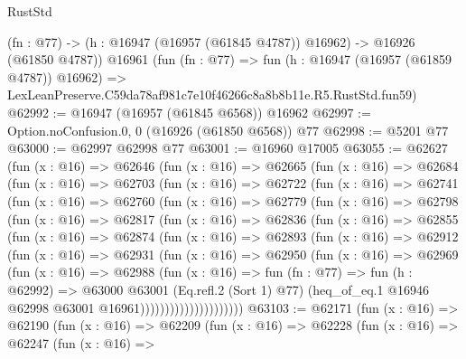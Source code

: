 \begin{lexlean}{RustStd}
\begin{coremodule}
    (fn : @77) -> (h : @16947 (@16957 (@61845 @4787)) @16962) -> @16926 (@61850 @4787))
    @16961
    (fun (fn : @77) =>
    fun (h : @16947 (@16957 (@61859 @4787)) @16962) =>
    LexLeanPreserve.C59da78af981c7e10f46266c8a8b8b11e.R5.RustStd.fun59)
@62992 := @16947 (@16957 (@61845 @6568)) @16962
@62997 := Option.noConfusion.{0, 0} (@16926 (@61850 @6568)) @77
@62998 := @5201 @77
@63000 := @62997 @62998 @77
@63001 := @16960 @17005
@63055 := @62627
    (fun (x : @16) =>
    @62646
      (fun (x : @16) =>
      @62665
        (fun (x : @16) =>
        @62684
          (fun (x : @16) =>
          @62703
            (fun (x : @16) =>
            @62722
              (fun (x : @16) =>
              @62741
                (fun (x : @16) =>
                @62760
                  (fun (x : @16) =>
                  @62779
                    (fun (x : @16) =>
                    @62798
                      (fun (x : @16) =>
                      @62817
                        (fun (x : @16) =>
                        @62836
                          (fun (x : @16) =>
                          @62855
                            (fun (x : @16) =>
                            @62874
                              (fun (x : @16) =>
                              @62893
                                (fun (x : @16) =>
                                @62912
                                  (fun (x : @16) =>
                                  @62931
                                    (fun (x : @16) =>
                                    @62950
                                      (fun (x : @16) =>
                                      @62969
                                        (fun (x : @16) =>
                                        @62988
                                          (fun (x : @16) =>
                                          fun (fn : @77) =>
                                          fun (h : @62992) =>
                                          @63000
                                            @63001
                                            (Eq.refl.{2} (Sort 1) @77)
                                            (heq_of_eq.{1}
                                              @16946
                                              @62998
                                              @63001
                                              @16961)))))))))))))))))))))
@63103 := @62171
    (fun (x : @16) =>
    @62190
      (fun (x : @16) =>
      @62209
        (fun (x : @16) =>
        @62228
          (fun (x : @16) =>
          @62247
            (fun (x : @16) =>

\end{coremodule}
\end{lexlean}
